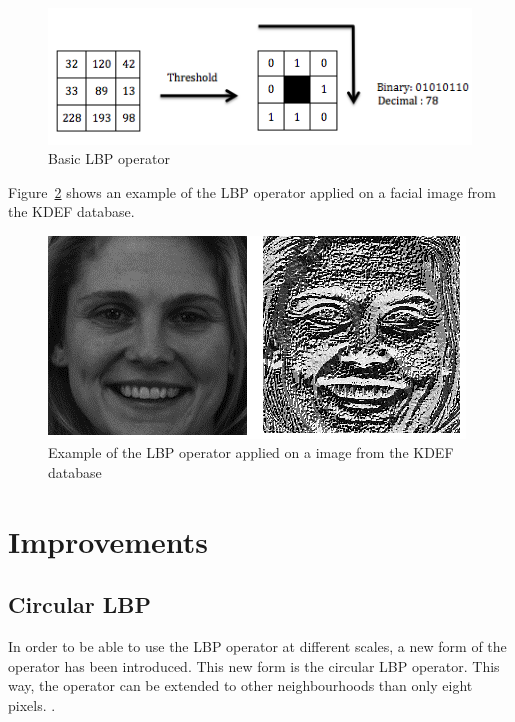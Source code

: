 \begin{figure}[!h]
\begin{center}
\noindent \includegraphics[scale=0.7]{figures/lbp_basic_operator} 
\newline
\caption{Basic LBP operator}
\label{lbp_basic_operator}
\end{center} 
\end{figure}

\noindent Figure~\ref{lbp_basic_operator_example} shows an example of the LBP operator applied on a facial image from the KDEF database.
\newline

\begin{figure}[!h]
\begin{center}
\noindent \includegraphics[scale=0.8]{figures/lbp_basic_operator_example} 
\newline
\caption{Example of the LBP operator applied on a image from the KDEF database}
\label{lbp_basic_operator_example}
\end{center} 
\end{figure}

\section{Improvements}

\subsection{Circular LBP}

\vspace{\baselineskip}
\noindent In order to be able to use the LBP operator at different scales, a new form of the operator has been introduced. This new form is the circular LBP operator. This way, the operator can be extended to other neighbourhoods than only eight pixels. \cite{GAN08}.
\newline

